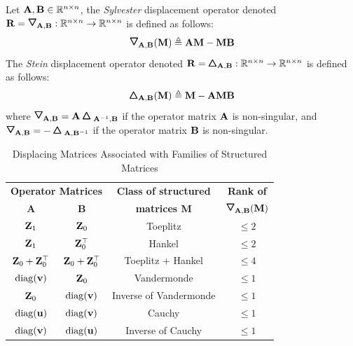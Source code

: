 \begin{definition}
  Let $\mathbf{A}, \mathbf{B} \in \mathbb{R}^{n \times n}$, the \emph{Sylvester} displacement operator denoted $\Rmat = \triangleopdown_{\Amat, \Bmat}: \Rbb^{n \times n} \rightarrow \Rbb^{n \times n}$ is defined as follows:
  \begin{equation}
    \triangleopdown_{\Amat, \Bmat} (\Mmat) \triangleq \Amat \Mmat - \Mmat \Bmat
  \end{equation}
  The \emph{Stein} displacement operator denoted $\mathbf{R} = \pmb{\bigtriangleup}_{\mathbf{A}, \mathbf{B}}: \mathbb{R}^{n \times n} \rightarrow \mathbb{R}^{n \times n}$ is defined as follows:
  \begin{equation}
    \pmb{\bigtriangleup}_{\mathbf{A}, \mathbf{B}} (\mathbf{M}) \triangleq \mathbf{M} - \mathbf{A} \mathbf{M} \mathbf{B}
  \end{equation}
  where $\triangleopdown_{\Amat, \Bmat} = \Amat \triangleopup_{\Amat^{-1}, \Bmat}$ if the operator matrix $\mathbf{A}$ is non-singular, and $\triangleopdown_{\Amat, \Bmat} = -\triangleopup_{\Amat, \Bmat^{-1}}$ if the operator matrix $\mathbf{B}$ is non-singular.
\end{definition}
\begin{table}[t]
  \centering
  {\small
  \begin{tabular}{c|c|c|c}
    \toprule
    \multicolumn{2}{c|}{\textbf{Operator Matrices}} & \textbf{Class of structured} & \textbf{Rank of } \\
    \textbf{A} & \textbf{B} & \textbf{matrices M} & $\triangleopdown_{\Amat, \Bmat}(\Mmat)$ \\
    \midrule
    $\mathbf{Z}_1$                & $\mathbf{Z}_0$                & Toeplitz               & $\leq 2$ \\
    $\mathbf{Z}_1$                & $\mathbf{Z}_0^\top$           & Hankel                 & $\leq 2$ \\
    $\mathbf{Z}_0 + \mathbf{Z}_0^\top$ & $\mathbf{Z}_0 + \mathbf{Z}_0^\top$ & Toeplitz + Hankel      & $\leq 4$ \\
    $\operatorname*{diag}(\mathbf{v})$           & $\mathbf{Z}_0$                & Vandermonde            & $\leq 1$ \\
    $\mathbf{Z}_0$                & $\operatorname*{diag}(\mathbf{v})$           & Inverse of Vandermonde & $\leq 1$ \\
    $\operatorname*{diag}(\mathbf{u})$           & $\operatorname*{diag}(\mathbf{v})$           & Cauchy                 & $\leq 1$ \\
    $\operatorname*{diag}(\mathbf{v})$           & $\operatorname*{diag}(\mathbf{u})$           & Inverse of Cauchy      & $\leq 1$ \\
    \bottomrule
  \end{tabular}
  }
  \caption{Displacing Matrices Associated with Families of Structured Matrices \cite{pan2001structured}}
  \label{table:ch2-displacing_matrices}
  \vspace{0.5cm}
\end{table}

